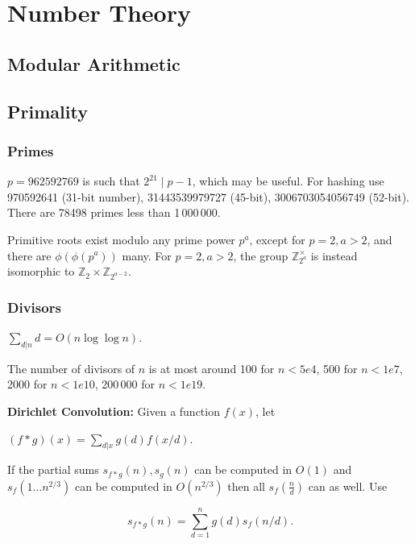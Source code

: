 \chapter{Number Theory}

\section{Modular Arithmetic}

\section{Primality}
	\subsection{Primes}
	$p=962592769$ is such that $2^{21} \mid p-1$, which may be useful. For hashing
	use 970592641 (31-bit number), 31443539979727 (45-bit), 3006703054056749
	(52-bit). There are 78498 primes less than 1\,000\,000.

	Primitive roots exist modulo any prime power $p^a$, except for $p = 2, a > 2$, and there are $\phi(\phi(p^a))$ many.
	For $p = 2, a > 2$, the group $\mathbb Z_{2^a}^\times$ is instead isomorphic to $\mathbb Z_2 \times \mathbb Z_{2^{a-2}}$.

	\subsection{Divisors}
	$\sum_{d|n} d = O(n \log \log n)$.

	The number of divisors of $n$ is at most around 100 for $n < 5e4$, 500 for $n < 1e7$, 2000 for $n < 1e10$, 200\,000 for $n < 1e19$.

	\textbf{Dirichlet Convolution:} Given a function $f(x)$, let 

	$(f*g)(x)=\sum_{d|x}g(d)f(x/d)$. 

	If the partial sums $s_{f*g}(n),s_g(n)$ can be computed in $O(1)$ and $s_f(1\ldots n^{2/3})$ can be computed in $O\left(n^{2/3}\right)$ then all $s_f\left(\frac{n}{d}\right)$ can as well. Use

	$$s_{f*g}(n)=\sum_{d=1}^ng(d)s_f(n/d).$$ 

